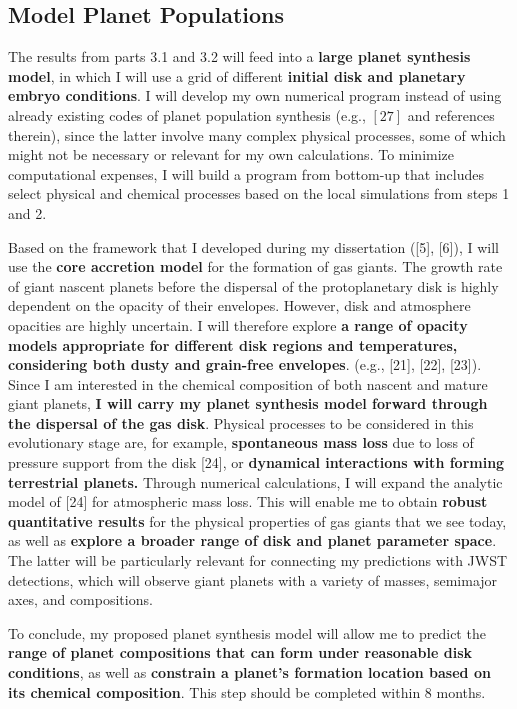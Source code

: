 \documentclass[12pt, letterpaper]{article}
\begin{document}

\subsection{Model Planet Populations} 

The results from parts 3.1 and 3.2 will feed into a \textbf{large planet synthesis model}, in which I will use a grid of different \textbf{initial disk and planetary embryo conditions}. I will develop my own numerical program instead of using already existing codes of planet population synthesis (e.g., $[27]$ and references therein), since the latter involve many complex physical processes, some of which might not be necessary or relevant for my own calculations. To minimize computational expenses, I will build a program from bottom-up that includes select physical and chemical processes based on the local simulations from steps 1 and 2. 

Based on the framework that I developed during my dissertation ([5], [6]), I will use the \textbf{core accretion model} for the formation of gas giants. The growth rate of giant nascent planets before the dispersal of the protoplanetary disk is highly dependent on the opacity of their envelopes. However, disk and atmosphere opacities are highly uncertain. I will therefore explore \textbf{a range of opacity models appropriate for different disk regions and temperatures, considering both dusty and grain-free envelopes}. (e.g., [21], [22], [23]). Since I am interested in the chemical composition of both nascent and mature giant planets, \textbf{I will carry my planet synthesis model forward through the dispersal of the gas disk}. Physical processes to be considered in this evolutionary stage are, for example, \textbf{spontaneous mass loss} due to loss of pressure support from the disk [24], or \textbf{dynamical interactions with forming terrestrial planets.}  Through numerical calculations, I will expand the analytic model of [24] for atmospheric mass loss. This will enable me to obtain \textbf{robust quantitative results} for the physical properties of gas giants that we see today, as well as \textbf{explore a broader range of disk and planet parameter space}. The latter will be particularly relevant for connecting my predictions with JWST detections, which will observe giant planets with a variety of masses, semimajor axes, and compositions.    

To conclude, my proposed planet synthesis model will allow me to predict the \textbf{range of planet compositions that can form under reasonable disk conditions}, as well as \textbf{constrain a planet's formation location based on its chemical composition}. %
This step should be completed within 8 months.
\end{document}
